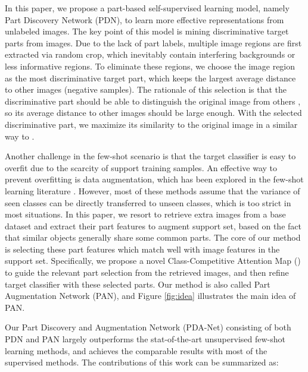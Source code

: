 \documentclass{article}
\begin{document}
In this paper, we propose a part-based self-supervised learning model, namely Part Discovery Network (PDN), to learn more effective representations from unlabeled images. The key point of this model is mining discriminative target parts from images. Due to the lack of part labels, multiple image regions are first extracted via random crop, which inevitably contain interfering backgrounds or less informative regions. To eliminate these regions, we choose the image region as the most discriminative target part, which keeps the largest average distance to other images (negative samples). The rationale of this selection is that the discriminative part should be able to distinguish the original image from others \cite{singh2012unsupervised}, so its average distance to other images should be large enough. With the selected discriminative part, we maximize its similarity to the original image in a similar way to \cite{He2020MomentumCF}.












Another challenge in the few-shot scenario is that the target classifier is easy to overfit due to the scarcity of support training samples. An effective way to prevent overfitting is data augmentation, which has been explored in the few-shot learning literature \cite{NEURIPS2018_1714726c,wang2018low}. However, most of these methods assume that the variance of seen classes can be directly transferred to unseen classes, which is too strict in most situations. 
In this paper, we resort to retrieve extra images from a base dataset and extract their part features to augment support set, based on the fact that similar objects generally share some common parts. 
The core of our method is selecting these part features which match well with image features in the support set.
Specifically, we propose a novel Class-Competitive Attention Map () to guide the relevant part selection from the retrieved images, and then refine target classifier with these selected parts. 
Our method is also called Part Augmentation Network (PAN), and Figure \ref{fig:idea} illustrates the main idea of PAN.



Our Part Discovery and Augmentation Network (PDA-Net) consisting of both PDN and PAN largely outperforms the stat-of-the-art unsupervised few-shot learning methods, and achieves the comparable results with most of the supervised methods. The contributions of this work can be summarized as:
\end{document}
